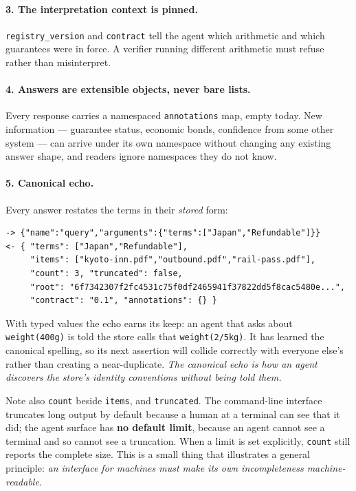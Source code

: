 \paragraph{3. The interpretation context is pinned.} \texttt{registry\_version}
and \texttt{contract} tell the agent which arithmetic and which guarantees
were in force. A verifier running different arithmetic must refuse rather than
misinterpret.

\paragraph{4. Answers are extensible objects, never bare lists.} Every
response carries a namespaced \texttt{annotations} map, empty today. New
information --- guarantee status, economic bonds, confidence from some other
system --- can arrive under its own namespace without changing any existing
answer shape, and readers ignore namespaces they do not know.

\paragraph{5. Canonical echo.} Every answer restates the terms in their
\emph{stored} form:

\begin{lstlisting}
-> {"name":"query","arguments":{"terms":["Japan","Refundable"]}}
<- { "terms": ["Japan","Refundable"],
     "items": ["kyoto-inn.pdf","outbound.pdf","rail-pass.pdf"],
     "count": 3, "truncated": false,
     "root": "6f7342307f2fc4531c75f0df2465941f37822dd5f8cac5480e...",
     "contract": "0.1", "annotations": {} }
\end{lstlisting}

With typed values the echo earns its keep: an agent that asks about
\verb|weight(400g)| is told the store calls that \verb|weight(2/5kg)|. It has
learned the canonical spelling, so its next assertion will collide correctly
with everyone else's rather than creating a near-duplicate. \emph{The canonical
echo is how an agent discovers the store's identity conventions without being
told them.}

Note also \texttt{count} beside \texttt{items}, and \texttt{truncated}. The
command-line interface truncates long output by default because a human at a
terminal can see that it did; the agent surface has \textbf{no default limit},
because an agent cannot see a terminal and so cannot see a truncation. When a
limit is set explicitly, \texttt{count} still reports the complete size. This
is a small thing that illustrates a general principle: \emph{an interface for
machines must make its own incompleteness machine-readable.}

